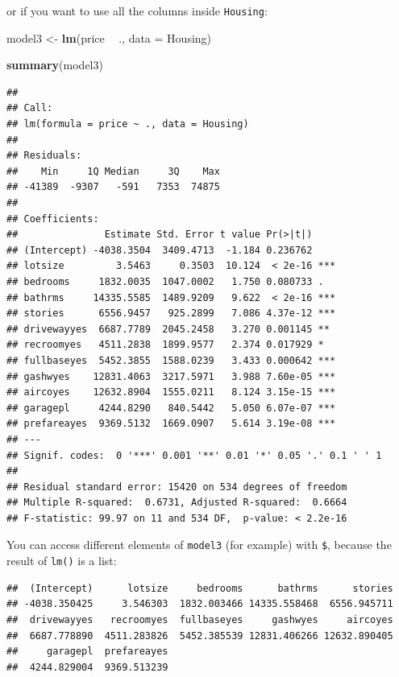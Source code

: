\documentclass[]{gitbook}
\newenvironment{Shaded}{\begin{snugshade}}{\end{snugshade}}
\newcommand{\DataTypeTok}[1]{\textcolor[rgb]{0.13,0.29,0.53}{#1}}
\newcommand{\KeywordTok}[1]{\textcolor[rgb]{0.13,0.29,0.53}{\textbf{#1}}}
\newcommand{\NormalTok}[1]{#1}
\newcommand{\OperatorTok}[1]{\textcolor[rgb]{0.81,0.36,0.00}{\textbf{#1}}}
\newcommand{\StringTok}[1]{\textcolor[rgb]{0.31,0.60,0.02}{#1}}
\theoremstyle{definition}
\theoremstyle{definition}
\theoremstyle{definition}
\theoremstyle{remark}
\begin{document}
or if you want to use all the columns inside \texttt{Housing}:

\begin{Shaded}
\begin{Highlighting}[]
\NormalTok{model3 <-}\StringTok{ }\KeywordTok{lm}\NormalTok{(price }\OperatorTok{~}\StringTok{ }\NormalTok{., }\DataTypeTok{data =}\NormalTok{ Housing)}

\KeywordTok{summary}\NormalTok{(model3)}
\end{Highlighting}
\end{Shaded}

\begin{verbatim}
## 
## Call:
## lm(formula = price ~ ., data = Housing)
## 
## Residuals:
##    Min     1Q Median     3Q    Max 
## -41389  -9307   -591   7353  74875 
## 
## Coefficients:
##               Estimate Std. Error t value Pr(>|t|)    
## (Intercept) -4038.3504  3409.4713  -1.184 0.236762    
## lotsize         3.5463     0.3503  10.124  < 2e-16 ***
## bedrooms     1832.0035  1047.0002   1.750 0.080733 .  
## bathrms     14335.5585  1489.9209   9.622  < 2e-16 ***
## stories      6556.9457   925.2899   7.086 4.37e-12 ***
## drivewayyes  6687.7789  2045.2458   3.270 0.001145 ** 
## recroomyes   4511.2838  1899.9577   2.374 0.017929 *  
## fullbaseyes  5452.3855  1588.0239   3.433 0.000642 ***
## gashwyes    12831.4063  3217.5971   3.988 7.60e-05 ***
## aircoyes    12632.8904  1555.0211   8.124 3.15e-15 ***
## garagepl     4244.8290   840.5442   5.050 6.07e-07 ***
## prefareayes  9369.5132  1669.0907   5.614 3.19e-08 ***
## ---
## Signif. codes:  0 '***' 0.001 '**' 0.01 '*' 0.05 '.' 0.1 ' ' 1
## 
## Residual standard error: 15420 on 534 degrees of freedom
## Multiple R-squared:  0.6731, Adjusted R-squared:  0.6664 
## F-statistic: 99.97 on 11 and 534 DF,  p-value: < 2.2e-16
\end{verbatim}

You can access different elements of \texttt{model3} (for example) with
\texttt{\$}, because the result of \texttt{lm()} is a list:

\begin{Shaded}
\end{Shaded}

\begin{verbatim}
##  (Intercept)      lotsize     bedrooms      bathrms      stories 
## -4038.350425     3.546303  1832.003466 14335.558468  6556.945711 
##  drivewayyes   recroomyes  fullbaseyes     gashwyes     aircoyes 
##  6687.778890  4511.283826  5452.385539 12831.406266 12632.890405 
##     garagepl  prefareayes 
##  4244.829004  9369.513239
\end{verbatim}
\end{document}

